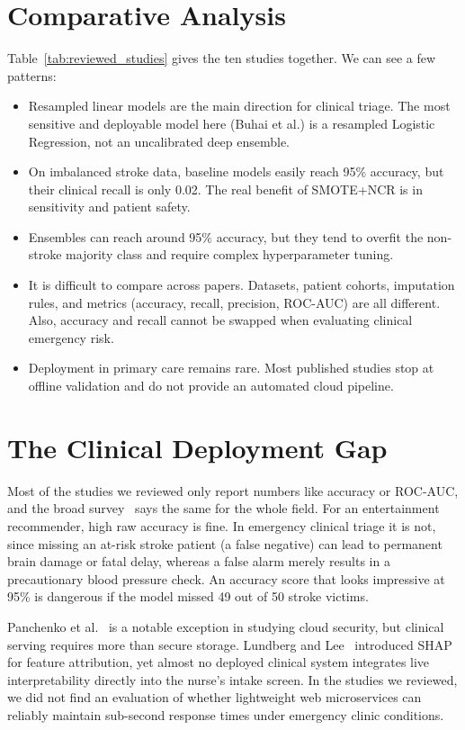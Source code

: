 \documentclass[10pt,journal,compsoc]{IEEEtran}
\begin{document}
\section{Comparative Analysis}
Table~\ref{tab:reviewed_studies} gives the ten studies together. We can see a few patterns:
\begin{itemize}
    \item Resampled linear models are the main direction for clinical triage. The most sensitive and deployable model here (Buhai et al.) is a resampled Logistic Regression, not an uncalibrated deep ensemble.
    \item On imbalanced stroke data, baseline models easily reach 95\% accuracy, but their clinical recall is only 0.02. The real benefit of SMOTE+NCR is in sensitivity and patient safety.
    \item Ensembles can reach around 95\% accuracy, but they tend to overfit the non-stroke majority class and require complex hyperparameter tuning.
    \item It is difficult to compare across papers. Datasets, patient cohorts, imputation rules, and metrics (accuracy, recall, precision, ROC-AUC) are all different. Also, accuracy and recall cannot be swapped when evaluating clinical emergency risk.
    \item Deployment in primary care remains rare. Most published studies stop at offline validation and do not provide an automated cloud pipeline.
\end{itemize}

\section{The Clinical Deployment Gap}
\label{sec:gap}
Most of the studies we reviewed only report numbers like accuracy or ROC-AUC, and the broad survey~\cite{paleyes2022} says the same for the whole field. For an entertainment recommender, high raw accuracy is fine. In emergency clinical triage it is not, since missing an at-risk stroke patient (a false negative) can lead to permanent brain damage or fatal delay, whereas a false alarm merely results in a precautionary blood pressure check. An accuracy score that looks impressive at 95\% is dangerous if the model missed 49 out of 50 stroke victims.

Panchenko et al.~\cite{panchenko2024} is a notable exception in studying cloud security, but clinical serving requires more than secure storage. Lundberg and Lee~\cite{lundberg2017} introduced SHAP for feature attribution, yet almost no deployed clinical system integrates live interpretability directly into the nurse's intake screen. In the studies we reviewed, we did not find an evaluation of whether lightweight web microservices can reliably maintain sub-second response times under emergency clinic conditions.
\end{document}
